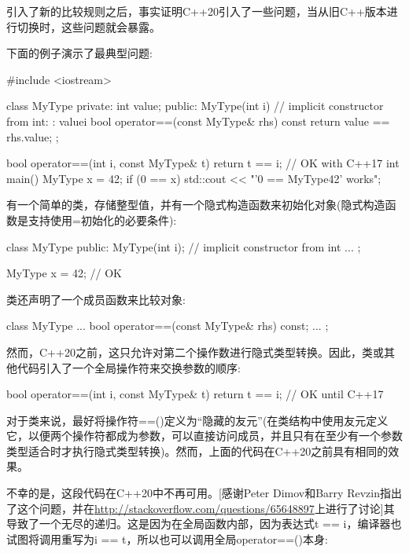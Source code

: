 
引入了新的比较规则之后，事实证明C++20引入了一些问题，当从旧C++版本进行切换时，这些问题就会暴露。


下面的例子演示了最典型问题:


\begin{cpp}
#include <iostream>

class MyType {
private:
	int value;
public:
	MyType(int i) // implicit constructor from int:
		: value{i} {
	}
	bool operator==(const MyType& rhs) const {
		return value == rhs.value;
	}
};

bool operator==(int i, const MyType& t) {
	return t == i; // OK with C++17
}
int main()
{
	MyType x = 42;
	if (0 == x) {
		std::cout << "'0 == MyType{42}' works\n";
	}
}
\end{cpp}

有一个简单的类，存储整型值，并有一个隐式构造函数来初始化对象(隐式构造函数是支持使用=初始化的必要条件):

\begin{cpp}
class MyType {
	public:
	MyType(int i); // implicit constructor from int
	...
};

MyType x = 42; // OK
\end{cpp}

类还声明了一个成员函数来比较对象:

\begin{cpp}
class MyType {
	...
	bool operator==(const MyType& rhs) const;
	...
};
\end{cpp}

然而，C++20之前，这只允许对第二个操作数进行隐式类型转换。因此，类或其他代码引入了一个全局操作符来交换参数的顺序:

\begin{cpp}
bool operator==(int i, const MyType& t) {
	return t == i; // OK until C++17
}
\end{cpp}

对于类来说，最好将操作符==()定义为“隐藏的友元”(在类结构中使用友元定义它，以便两个操作符都成为参数，可以直接访问成员，并且只有在至少有一个参数类型适合时才执行隐式类型转换)。然而，上面的代码在C++20之前具有相同的效果。

不幸的是，这段代码在C++20中不再可用。[感谢Peter Dimov和Barry Revzin指出了这个问题，并在\url{http://stackoverflow.com/questions/65648897}上进行了讨论]其导致了一个无尽的递归。这是因为在全局函数内部，因为表达式t == i，编译器也试图将调用重写为i == t，所以也可以调用全局operator==()本身:

